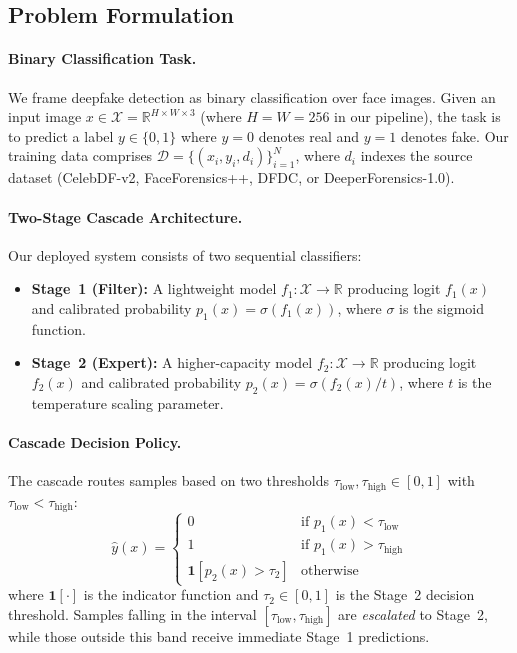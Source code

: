 \label{sec:method}
\subsection{Problem Formulation}
\label{sec:problem_formulation}

\paragraph{Binary Classification Task.}
We frame deepfake detection as binary classification over face images. Given an input image $x \in \mathcal{X} = \mathbb{R}^{H \times W \times 3}$ (where $H=W=256$ in our pipeline), the task is to predict a label $y \in \{0, 1\}$ where $y=0$ denotes real and $y=1$ denotes fake. Our training data comprises $\mathcal{D} = \{(x_i, y_i, d_i)\}_{i=1}^N$, where $d_i$ indexes the source dataset (CelebDF\hyp v2, FaceForensics++, DFDC, or DeeperForensics\hyp 1.0).

\paragraph{Two-Stage Cascade Architecture.}
Our deployed system consists of two sequential classifiers:
\begin{itemize}[leftmargin=*,itemsep=2pt,parsep=0pt]
  \item \textbf{Stage~1 (Filter):} A lightweight model $f_1: \mathcal{X} \to \mathbb{R}$ producing logit $f_1(x)$ and calibrated probability $p_1(x) = \sigma(f_1(x))$, where $\sigma$ is the sigmoid function.
  \item \textbf{Stage~2 (Expert):} A higher\hyp capacity model $f_2: \mathcal{X} \to \mathbb{R}$ producing logit $f_2(x)$ and calibrated probability $p_2(x) = \sigma(f_2(x) / t)$, where $t$ is the temperature scaling parameter.
\end{itemize}

\paragraph{Cascade Decision Policy.}
The cascade routes samples based on two thresholds $\tau_{\mathrm{low}}, \tau_{\mathrm{high}} \in [0,1]$ with $\tau_{\mathrm{low}} < \tau_{\mathrm{high}}$:
\begin{equation}
\label{eq:cascade_policy}
\hat{y}(x) = \begin{cases}
0 & \text{if } p_1(x) < \tau_{\mathrm{low}} \\
1 & \text{if } p_1(x) > \tau_{\mathrm{high}} \\
\mathbf{1}[p_2(x) > \tau_2] & \text{otherwise}
\end{cases}
\end{equation}
where $\mathbf{1}[\cdot]$ is the indicator function and $\tau_2 \in [0,1]$ is the Stage~2 decision threshold. Samples falling in the interval $[\tau_{\mathrm{low}}, \tau_{\mathrm{high}}]$ are \emph{escalated} to Stage~2, while those outside this band receive immediate Stage~1 predictions.


